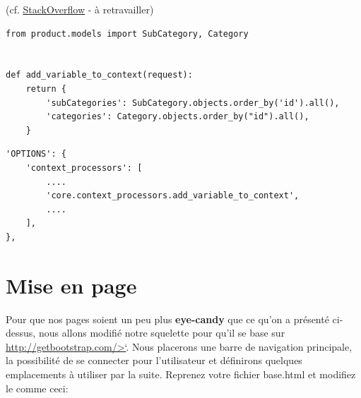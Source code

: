 \documentclass[11pt]{amsbook}
\begin{document}
(cf. \href{https://stackoverflow.com/questions/60515797/default-context-for-all-pages-django}{StackOverflow} - à retravailler)


\begin{verbatim}
from product.models import SubCategory, Category


def add_variable_to_context(request):
    return {
        'subCategories': SubCategory.objects.order_by('id').all(),
        'categories': Category.objects.order_by("id").all(),
    }
\end{verbatim}

\begin{verbatim}
'OPTIONS': {
    'context_processors': [
        ....
        'core.context_processors.add_variable_to_context',
        ....
    ],
},
\end{verbatim}

\hypertarget{x-mise-en-page}{\section{Mise en page}}
Pour que nos pages soient un peu plus \textbf{eye-candy} que ce qu’on a présenté ci-dessus, nous allons modifié notre squelette pour qu’il se base sur \href{http://getbootstrap.com/>`}{http://getbootstrap.com/>`}. Nous placerons une barre de navigation principale, la possibilité de se connecter pour l’utilisateur et définirons quelques emplacements à utiliser par la suite. Reprenez votre fichier base.html et modifiez le comme ceci:
\end{document}
